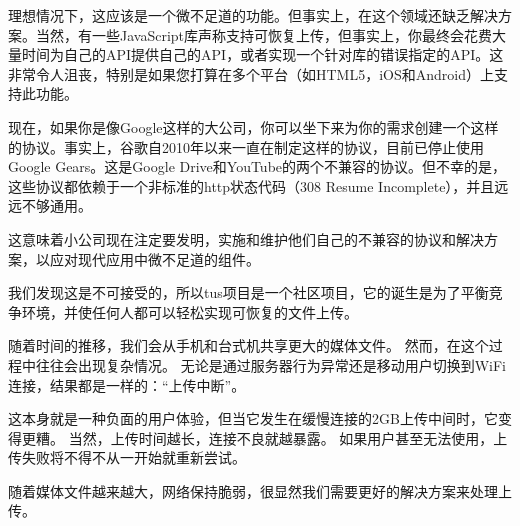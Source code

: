 \documentclass[bachelor]{thesis-uestc}
\begin{document}
理想情况下，这应该是一个微不足道的功能。但事实上，在这个领域还缺乏解决方案。当然，有一些JavaScript库声称支持可恢复上传，但事实上，你最终会花费大量时间为自己的API提供自己的API，或者实现一个针对库的错误指定的API。这非常令人沮丧，特别是如果您打算在多个平台（如HTML5，iOS和Android）上支持此功能。

现在，如果你是像Google这样的大公司，你可以坐下来为你的需求创建一个这样的协议。事实上，谷歌自2010年以来一直在制定这样的协议，目前已停止使用Google Gears。这是Google Drive和YouTube的两个不兼容的协议。但不幸的是，这些协议都依赖于一个非标准的http状态代码（308 Resume Incomplete），并且远远不够通用。

这意味着小公司现在注定要发明，实施和维护他们自己的不兼容的协议和解决方案，以应对现代应用中微不足道的组件。

我们发现这是不可接受的，所以tus项目是一个社区项目，它的诞生是为了平衡竞争环境，并使任何人都可以轻松实现可恢复的文件上传。

随着时间的推移，我们会从手机和台式机共享更大的媒体文件。 然而，在这个过程中往往会出现复杂情况。 无论是通过服务器行为异常还是移动用户切换到WiFi连接，结果都是一样的：“上传中断”。

这本身就是一种负面的用户体验，但当它发生在缓慢连接的2GB上传中间时，它变得更糟。 当然，上传时间越长，连接不良就越暴露。 如果用户甚至无法使用，上传失败将不得不从一开始就重新尝试。

随着媒体文件越来越大，网络保持脆弱，很显然我们需要更好的解决方案来处理上传。
\end{document}
